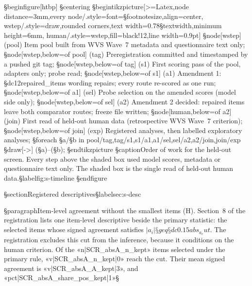 §begin{figure}[htbp]
§centering
§begin{tikzpicture}[>=Latex,node distance=3mm,every node/.style={font=§footnotesize,align=center},
  wstep/.style={draw,rounded corners,text width=0.78§textwidth,minimum height=6mm},
  human/.style={wstep,fill=black!12,line width=0.9pt}]
§node[wstep] (pool) {Item pool built from WVS Wave~7 metadata and questionnaire text only};
§node[wstep,below=of pool] (tag) {Preregistration committed and timestamped by a pushed git tag};
§node[wstep,below=of tag] (s1) {First scoring pass of the pool, adapters only; probe read};
§node[wstep,below=of s1] (a1) {Amendment 1: §dc{12}{repaired_items} wording repairs; every route re-scored as one run};
§node[wstep,below=of a1] (sel) {Probe selection on the amended scores (model side only)};
§node[wstep,below=of sel] (a2) {Amendment 2 decided: repaired items leave both comparator routes; freeze file written};
§node[human,below=of a2] (join) {First read of held-out human data (retrospective WVS Wave~7 criterion)};
§node[wstep,below=of join] (exp) {Registered analyses, then labelled exploratory analyses};
§foreach §a/§b in {pool/tag,tag/s1,s1/a1,a1/sel,sel/a2,a2/join,join/exp} §draw[->] (§a)--(§b);
§end{tikzpicture}
§caption{Order of work for the held-out screen. Every step above the shaded box used model scores, metadata or questionnaire text only. The shaded box is the single read of held-out human data.}§label{fig:s-timeline}
§end{figure}

§section{Registered descriptives}§label{sec:s-desc}

§paragraph{Item-level agreement without the smallest items (H).} Section~8 of the registration lists one item-level descriptive beside the primary statistic: the selected items whose signed agreement satisfies $|a_i|§geq §dc{0.15}{abs_a_cut}$. The registration excludes this cut from the inference, because it conditions on the human criterion. Of the «n|SCR_absA_n_kept» items selected under the primary rule, «v|SCR_absA_n_kept|0» reach the cut. Their mean signed agreement is «v|SCR_absA_A_kept|3», and «pct|SCR_absA_share_pos_kept|1»§%

